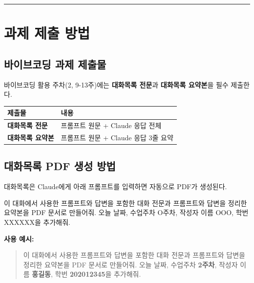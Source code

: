 \documentclass[11pt, a4paper]{article}
\begin{document}
\vspace{3pt}
\noindent\rule{\textwidth}{0.3pt}

\section{과제 제출 방법}

\subsection{바이브코딩 과제 제출물}

바이브코딩 활용 주차(2, 9-13주)에는 \textbf{대화목록 전문}과 \textbf{대화목록 요약본}을 필수 제출한다.

\begin{table}[H]
\centering
\begin{tabular}{|L{4cm}|L{9.5cm}|}
\hline
{}
\textbf{제출물} & \textbf{내용} \\
\hline
\textbf{대화목록 전문} & 프롬프트 원문 + Claude 응답 전체 \\
\hline
\textbf{대화목록 요약본} & 프롬프트 원문 + Claude 응답 3줄 요약 \\
\hline
\end{tabular}
\end{table}

\subsection{대화목록 PDF 생성 방법}

대화목록은 Claude에게 아래 프롬프트를 입력하면 자동으로 PDF가 생성된다.

\begin{tcolorbox}[colback=lightorange, colframe=accentorange, boxrule=0.5pt, title={\textbf{대화목록 PDF 생성 프롬프트}}, fonttitle=\bfseries\color{accentorange!80!black}]
\small
이 대화에서 사용한 프롬프트와 답변을 포함한 대화 전문과 프롬프트와 답변을 정리한 요약본을 PDF 문서로 만들어줘. 오늘 날짜, 수업주차 O주차, 작성자 이름 OOO, 학번 XXXXXX을 추가해줘.
\end{tcolorbox}

\textbf{사용 예시:}
\begin{quote}
\small
이 대화에서 사용한 프롬프트와 답변을 포함한 대화 전문과 프롬프트와 답변을 정리한 요약본을 PDF 문서로 만들어줘. 오늘 날짜, 수업주차 \textbf{2주차}, 작성자 이름 \textbf{홍길동}, 학번 \textbf{202012345}을 추가해줘.
\end{quote}
\end{document}
